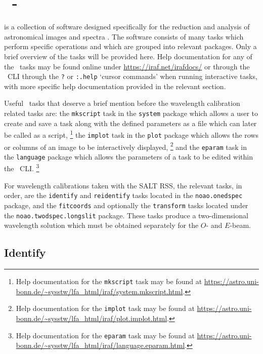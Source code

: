 \section[\textsc{iraf}]{\iraf\ - } \label{sec:iraf}

 is a collection of software designed specifically for the reduction and analysis of astronomical images and spectra \citep{iraf:1986, iraf:1993}. The software consists of many tasks which perform specific operations and which are grouped into relevant packages. Only a brief overview of the tasks will be provided here. Help documentation for any of the \iraf\ tasks may be found online under \url{https://iraf.net/irafdocs/} or through the \iraf\ \gls{CLI} through the \texttt{?} or \texttt{:.help} `cursor commands' when running interactive tasks, with more specific help documentation provided in the relevant section.

Useful \iraf\ tasks that deserve a brief mention before the wavelength calibration related tasks are: the \texttt{mkscript} task in the \texttt{system} package which allows a user to create and save a task along with the defined parameters as a file which can later be called as a script,%
\footnote{Help documentation for the \texttt{mkscript} task may be found at \url{https://astro.uni-bonn.de/~sysstw/lfa_html/iraf/system.mkscript.html}.}
the \texttt{implot} task in the \texttt{plot} package which allows the rows or columns of an image to be interactively displayed,%
\footnote{Help documentation for the \texttt{implot} task may be found at \url{https://astro.uni-bonn.de/~sysstw/lfa_html/iraf/plot.implot.html}.}
and the \texttt{eparam} task in the \texttt{language} package which allows the parameters of a task to be edited within the \iraf\ \gls{CLI}.%
\footnote{Help documentation for the \texttt{eparam} task may be found at \url{https://astro.uni-bonn.de/~sysstw/lfa_html/iraf/language.eparam.html}.}

For wavelength calibrations taken with the \gls{SALT} \gls{RSS}, the relevant tasks, in order, are the \texttt{identify} and \texttt{reidentify} tasks located in the \texttt{noao.onedspec} package, and the \texttt{fitcoords} and optionally the \texttt{transform} tasks located under the \texttt{noao.twodspec.long\-slit} package. These tasks produce a two-dimensional wavelength solution which must be obtained separately for the $O$- and $E$-beam.

\subsection{Identify}

